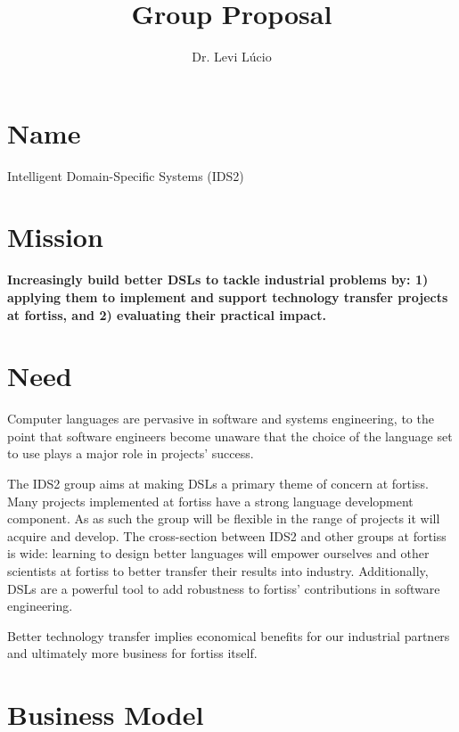 \documentclass{article}
\begin{document}
\title{Group Proposal}

\author{Dr. Levi L\'ucio}
 
\maketitle


\section{Name}

Intelligent Domain-Specific Systems (IDS2)

\section{Mission} 

\textbf{Increasingly build better DSLs to tackle industrial problems by:
1) applying them to implement and support technology transfer projects at
fortiss, and 2) evaluating their practical impact.}
 
\section{Need}

Computer languages are pervasive in software and systems engineering, to the
point that software engineers become unaware that the choice of the language set
to use plays a major role in projects' success. 

The IDS2 group aims at making DSLs a primary theme of concern at fortiss. Many
projects implemented at fortiss have a strong language development component. As
as such the group will be flexible in the range of projects it will acquire and
develop. The cross-section between IDS2 and other groups at fortiss is wide:
learning to design better languages will empower ourselves and other scientists
at fortiss to better transfer their results into industry. Additionally, DSLs
are a powerful tool to add robustness to fortiss' contributions in software
engineering.

Better technology transfer implies economical benefits for our industrial
partners and ultimately more business for fortiss itself.

\section{Business Model}
\end{document}
